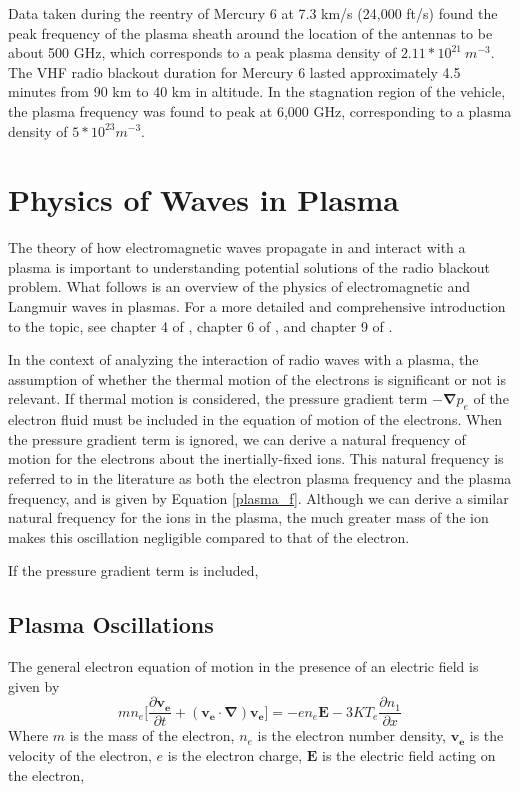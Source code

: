 \documentclass[twocolumn]{article}
\begin{document}
Data taken during the reentry of Mercury 6 at 7.3 km/s (24,000 ft/s) found the peak frequency of the plasma sheath around the location of the antennas to be about 500 GHz, which corresponds to a peak plasma density of $2.11*10^{21} \  m^{-3}$.
The VHF radio blackout duration for Mercury 6 lasted approximately 4.5 minutes from 90 km to 40 km in altitude.
In the stagnation region of the vehicle, the plasma frequency was found to peak at 6,000 GHz, corresponding to a plasma density of $5*10^{23} m^{-3}$. \cite{lehnert_plasma_1964}


\section{Physics of Waves in Plasma} \label{sec:Waves}
The theory of how electromagnetic waves propagate in and interact with a plasma is important to understanding potential solutions of the radio blackout problem.
What follows is an overview of the physics of electromagnetic and Langmuir waves in plasmas.
For a more detailed and comprehensive introduction to the topic, see chapter 4 of \cite{chen_introduction_1984}, chapter 6 of \cite{papas_theory_1965}, and chapter 9 of \cite{fitzpatrick_maxwells_2008}.

In the context of analyzing the interaction of radio waves with a plasma, the assumption of whether the thermal motion of the electrons is significant or not is relevant.
If thermal motion is considered, the pressure gradient term $-\mathbf{\nabla} p_e$ of the electron fluid must be included in the equation of motion of the electrons.
When the pressure gradient term is ignored, we can derive a natural frequency of motion for the electrons about the inertially-fixed ions.
This natural frequency is referred to in the literature as both the electron plasma frequency and the plasma frequency, and is given by Equation \ref{plasma_f}.
Although we can derive a similar natural frequency for the ions in the plasma, the much greater mass of the ion makes this oscillation negligible compared to that of the electron.


If the pressure gradient term is included, 
\subsection*{Plasma Oscillations}

The general electron equation of motion in the presence of an electric field is given by
\begin{equation} \label{eq:emotionhot}
mn_e \lbrack \frac{\partial \mathbf{v_e}}{\partial t} + \left( \mathbf{v_e} \cdot \mathbf{\nabla} \right) \mathbf{v_e} \rbrack = -en_e\mathbf{E} - 3KT_e \frac{\partial n_1}{\partial x}
\end{equation}
Where $m$ is the mass of the electron, $n_e$ is the electron number density, $\mathbf{v_e}$ is the velocity of the electron, $e$ is the electron charge, $\mathbf{E}$ is the electric field acting on the electron, 
\end{document}
